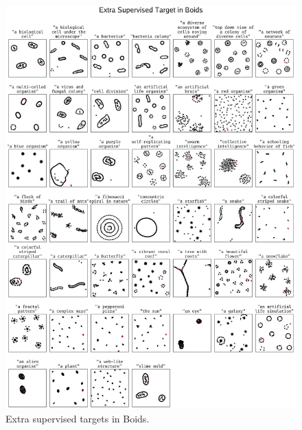 \documentclass{article}
\begin{document}
\begin{figure}[ht]
    \centering
    \includegraphics[width=1.0\linewidth]{figs/supervised_extra_1_compressed.pdf}
    \caption{Extra supervised targets in Boids.}
    \label{fig:supervised_extra_boids}
\end{figure}
\end{document}
